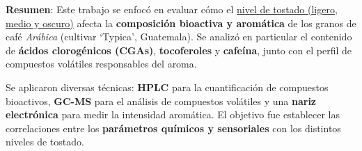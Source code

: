 \documentclass{article}
\begin{document}
\textbf{Resumen}: Este trabajo se enfocó en evaluar cómo el \underline{nivel de tostado (ligero, medio y oscuro)} afecta la \textbf{composición bioactiva y aromática} de los granos de café \textit{Arábica} (cultivar ‘Typica’, Guatemala). Se analizó en particular el contenido de \textbf{ácidos clorogénicos (CGAs)}, \textbf{tocoferoles} y \textbf{cafeína}, junto con el perfil de compuestos volátiles responsables del aroma.  

Se aplicaron diversas técnicas: \textbf{HPLC} para la cuantificación de compuestos bioactivos, \textbf{GC-MS} para el análisis de compuestos volátiles y una \textbf{nariz electrónica} para medir la intensidad aromática. El objetivo fue establecer las correlaciones entre los \textbf{parámetros químicos y sensoriales} con los distintos niveles de tostado. \vspace{0.5cm}
\end{document}
